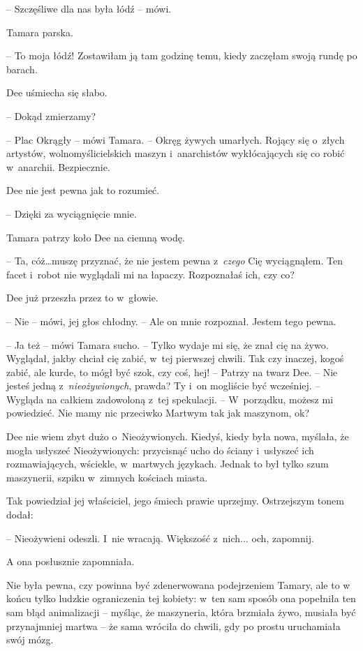 \documentclass[oneside,polish,11pt,sfheadings]{mwbk}
\begin{document}
-- Szczęśliwe dla nas była łódź -- mówi.

Tamara parska. 

-- To moja łódź! Zostawiłam ją tam godzinę temu, kiedy
zaczęłam swoją rundę po barach.

Dee uśmiecha się słabo. 

-- Dokąd zmierzamy?

-- Plac Okrągły -- mówi Tamara. -- Okręg żywych umarłych. Rojący się o~złych artystów, wolnomyślicielskich maszyn i~anarchistów wykłócających
się co robić w~anarchii. Bezpiecznie.

Dee nie jest pewna jak to rozumieć.

-- Dzięki za wyciągnięcie mnie.

Tamara patrzy koło Dee na ciemną wodę. 

-- Ta, cóż\ldots muszę przyznać, że
nie jestem pewna z~\emph{czego} Cię wyciągnąłem. Ten facet i~robot nie
wyglądali mi na łapaczy. Rozpoznałaś ich, czy co?

Dee już przeszła przez to w~głowie. 

-- Nie -- mówi, jej głos chłodny. -- Ale on mnie rozpoznał. Jestem tego pewna.

-- Ja też -- mówi Tamara sucho. -- Tylko wydaje mi się, że znał cię na
żywo. Wyglądał, jakby chciał cię zabić, w~tej pierwszej chwili. Tak czy
inaczej, kogoś zabić, ale kurde, to mógł być szok, czy coś, hej! -- Patrzy na twarz Dee. -- Nie jesteś jedną z~\emph{nieożywionych}, prawda?
Ty i~on mogliście być wcześniej. -- Wygląda na całkiem zadowoloną z~tej
spekulacji. -- W~porządku, możesz mi powiedzieć. Nie mamy nic przeciwko
Martwym tak jak maszynom, ok?

Dee nie wiem zbyt dużo o~Nieożywionych. Kiedyś, kiedy była nowa,
myślała, że mogła usłyszeć Nieożywionych: przycisnąć ucho do ściany i~usłyszeć ich rozmawiających, wściekle, w~martwych językach. Jednak to
był tylko szum maszynerii, szpiku w~zimnych kościach miasta.

Tak powiedział jej właściciel, jego śmiech prawie uprzejmy. Ostrzejszym
tonem dodał: 

-- Nieożywieni odeszli. I~nie wracają. Większość z~nich...
och, zapomnij.

A ona posłusznie zapomniała.

Nie była pewna, czy powinna być zdenerwowana podejrzeniem Tamary, ale to
w końcu tylko ludzkie ograniczenia tej kobiety: w~ten sam sposób ona
popełniła ten sam błąd animalizacji -- myśląc, że maszyneria, która
brzmiała żywo, musiała być przynajmniej martwa -- że sama wróciła do
chwili, gdy po prostu uruchamiała swój mózg.
\end{document}
